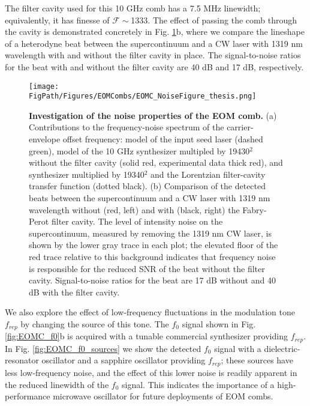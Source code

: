 The filter cavity used for this 10 GHz comb has a 7.5 MHz linewidth; equivalently, it has finesse of $\mathcal{F}\sim$1333. The effect of passing the comb through the cavity is demonstrated concretely in Fig. \ref{fig:EOMC_noise}b, where we compare the lineshape of a heterodyne beat between the supercontinuum and a CW laser with 1319 nm wavelength with and without the filter cavity in place. The signal-to-noise ratios for the beat with and without the filter cavity are 40 dB and 17 dB, respectively.


\begin{figure}[htpb]
	\begin{center}
		\texttt{[image: \\FigPath/Figures/EOMCombs/EOMC\_NoiseFigure\_thesis.png]}
	\end{center}
	\caption[Figure Title]{\textbf{Investigation of the noise properties of the EOM comb.}  (a) Contributions to the frequency-noise spectrum of the carrier-envelope offset frequency: model of the input seed laser (dashed green), model of the 10 GHz synthesizer multipled by 19430$^2$ without the filter cavity (solid red, experimental data thick red), and synthesizer multiplied by 19340$^2$ and the Lorentzian filter-cavity transfer function (dotted black). (b) Comparison of the detected beats between the supercontinuum and a CW laser with 1319 nm wavelength without (red, left) and with (black, right) the Fabry-Perot filter cavity. The level of intensity noise on the supercontinuum, measured by removing the 1319 nm CW laser, is shown by the lower gray trace in each plot; the elevated floor of the red trace relative to this background indicates that frequency noise is responsible for the reduced SNR of the beat without the filter cavity. Signal-to-noise ratios for the beat are 17 dB without and 40 dB with the filter cavity.}
	\label{fig:EOMC_noise}
\end{figure} 

We also explore the effect of low-frequency fluctuations in the modulation tone $f_{rep}$ by changing the source of this tone. The $f_0$ signal shown in Fig. \ref{fig:EOMC_f0}b is acquired with a tunable commercial synthesizer providing $f_{rep}$. In Fig. \ref{fig:EOMC_f0_sources} we show the detected $f_0$ signal with a dielectric-resonator oscillator and a sapphire oscillator providing $f_{rep}$; these sources have less low-frequency noise, and the effect of this lower noise is readily apparent in the reduced linewidth of the $f_0$ signal. This indicates the importance of a high-performance microwave oscillator for future deployments of EOM combs.



